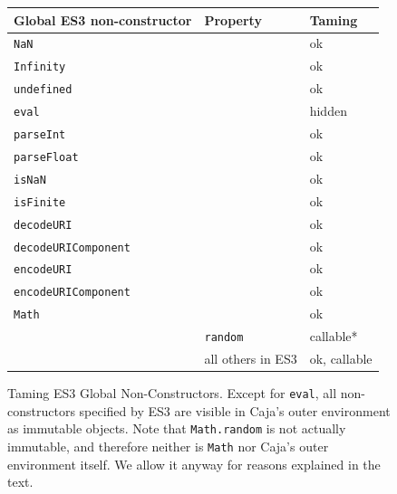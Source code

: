 \documentclass[letterpaper,twocolumn,10pt]{article}
\newcommand{\code}[1]{{\tt {#1}}}              %
\begin{document}
\begin{figure}
\begin{tabular}{lll}
  Global ES3 non-constructor & Property                   & Taming \\
  \hline
  \code{NaN}                &                             & ok \\
  \code{Infinity}           &                             & ok \\
  \code{undefined}          &                             & ok \\
  \code{eval}               &                             & hidden \\
  \code{parseInt}           &                             & ok \\
  \code{parseFloat}         &                             & ok \\
  \code{isNaN}              &                             & ok \\
  \code{isFinite}           &                             & ok \\
  \hline
  \code{decodeURI}          &                             & ok \\
  \code{decodeURIComponent} &                             & ok \\
  \code{encodeURI}          &                             & ok \\
  \code{encodeURIComponent} &                             & ok \\
  \hline
  \code{Math}               &                             & ok \\  
                            & \code{random}               & callable* \\
                            &           all others in ES3 & ok, callable \\
\end{tabular}

\caption[Taming ES3 Global Non-Constructors.]{Taming ES3 Global 
Non-Constructors. Except for \code{eval}, all non-constructors specified by 
ES3 are visible in Caja's outer environment as immutable objects. Note that 
\code{Math.random} is not actually immutable, and therefore neither is 
\code{Math} nor Caja's outer environment itself. We allow it anyway for 
reasons explained in the text.}
\label{tab:taming-es3}
\end{figure}
\end{document}
